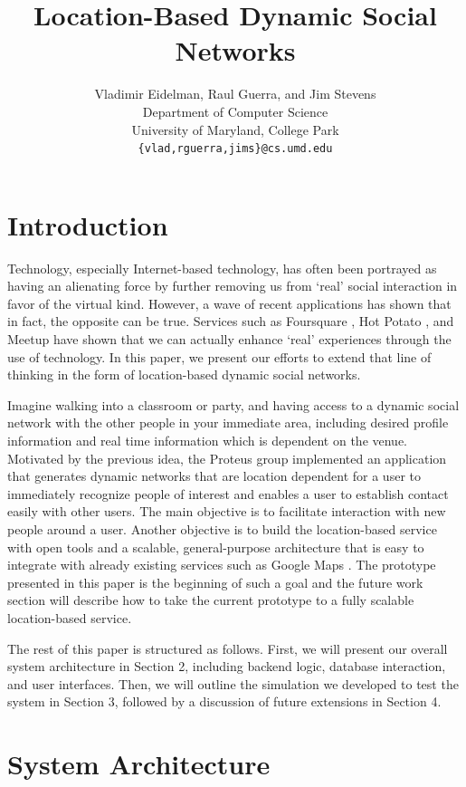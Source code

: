\documentclass[11pt]{article}
\title{Location-Based Dynamic Social Networks}
\author{
   Vladimir Eidelman, Raul Guerra, and Jim Stevens\\
Department of Computer Science \\
University of Maryland, College Park\\
 { \tt \{vlad,rguerra,jims\}@cs.umd.edu}
}
\begin{document}
\maketitle 

\section{Introduction}


Technology, especially Internet-based technology, has often been portrayed
as having an alienating force by further removing us from `real' social
interaction in favor of the virtual kind. However, a wave of recent
applications has shown that in fact, the opposite can be true. Services
such as Foursquare \cite{foursquare}, Hot Potato \cite{hotp}, and Meetup \cite{meetup} have
shown that we can actually enhance `real' experiences through the use
of technology. In this paper, we present our efforts to extend that line
of thinking in the form of location-based dynamic social networks.

Imagine walking into a classroom or party, and having access to a
dynamic social network with the other people in your immediate area,
including desired profile information and real time information which
is dependent on the venue. Motivated by the previous idea, the Proteus
group implemented an application that generates dynamic networks that are
location dependent for a user to immediately recognize people of interest
and enables a user to establish contact easily with other users. The
main objective is to facilitate interaction with new people around a user.
Another objective is to build the location-based service with open tools
and a scalable, general-purpose architecture that is easy to integrate
with already existing services such as Google Maps \cite{google}.
The prototype presented in this paper is the beginning of such a goal and
the future work section will describe how to take the current prototype
to a fully scalable location-based service.

The rest of this paper is structured as follows. First, we will present
our overall system architecture in Section 2, including backend logic,
database interaction, and user interfaces. Then, we will outline the
simulation we developed to test the system in Section 3, followed by a
discussion of future extensions in Section 4.


\section{System Architecture}
\end{document}
